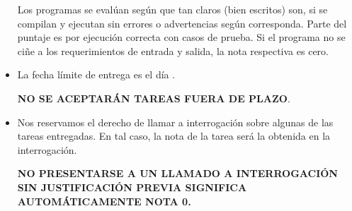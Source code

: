 \begin{itemize}
    Los programas se evalúan según que tan claros
    (bien escritos)
    son, si se compilan y ejecutan sin errores o advertencias según corresponda.
    Parte del puntaje es por ejecución correcta con casos de prueba.
    Si el programa no se ciñe a los requerimientos de entrada y salida,
    la nota respectiva es cero.
\fi    
  \item
    La fecha límite de entrega es el día .

    \begin{center}
        \Large{
          \textbf{NO SE ACEPTARÁN TAREAS FUERA DE PLAZO}.
        }
        \normalsize
    \end{center}
     
    
  \item
    Nos reservamos el derecho de llamar a interrogación
    sobre algunas de las tareas entregadas.
    En tal caso,
    la nota de la tarea será la obtenida en la interrogación.
    \begin{center}
      \Large{
        \textbf{NO PRESENTARSE A UN LLAMADO A INTERROGACIÓN SIN JUSTIFICACIÓN PREVIA SIGNIFICA AUTOMÁTICAMENTE NOTA 0.}
      }
    \end{center}
    
  \end{itemize}


  
